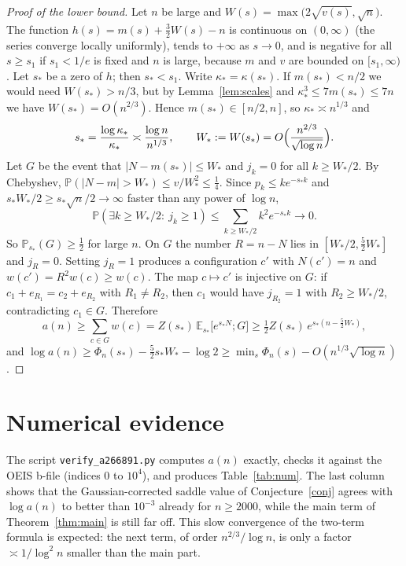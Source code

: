 \documentclass[11pt,a4paper]{article}
\theoremstyle{remark}
\begin{document}
\begin{proof}[Proof of the lower bound]
Let $n$ be large and $W(s)=\max\bigl(2\sqrt{v(s)},\sqrt n\bigr)$. The function $h(s)=m(s)+\frac32W(s)-n$ is continuous on $(0,\infty)$ (the series converge locally uniformly), tends to $+\infty$ as $s\to0$, and is negative for all $s\ge s_1$ if $s_1<1/e$ is fixed and $n$ is large, because $m$ and $v$ are bounded on $[s_1,\infty)$. Let $s_*$ be a zero of $h$; then $s_*<s_1$. Write $\kappa_*=\kappa(s_*)$. If $m(s_*)<n/2$ we would need $W(s_*)>n/3$, but by Lemma~\ref{lem:scales} and $\kappa_*^3\le7m(s_*)\le7n$ we have $W(s_*)=O(n^{2/3})$. Hence $m(s_*)\in[n/2,n]$, so $\kappa_*\asymp n^{1/3}$ and
\[
 s_*=\frac{\log\kappa_*}{\kappa_*}\asymp\frac{\log n}{n^{1/3}},\qquad W_*:=W(s_*)=O\Bigl(\frac{n^{2/3}}{\sqrt{\log n}}\Bigr).
\]
Let $G$ be the event that $|N-m(s_*)|\le W_*$ and $j_k=0$ for all $k\ge W_*/2$. By Chebyshev, $\mathbb P(|N-m|>W_*)\le v/W_*^2\le\frac14$. Since $p_k\le ke^{-s_*k}$ and $s_*W_*/2\ge s_*\sqrt n/2\to\infty$ faster than any power of $\log n$,
\[
 \mathbb P(\exists k\ge W_*/2:\ j_k\ge1)\le\sum_{k\ge W_*/2}k^2e^{-s_*k}\to0 .
\]
So $\mathbb P_{s_*}(G)\ge\frac12$ for large $n$. On $G$ the number $R=n-N$ lies in $[W_*/2,\frac52W_*]$ and $j_R=0$. Setting $j_R=1$ produces a configuration $c'$ with $N(c')=n$ and $w(c')=R^2w(c)\ge w(c)$. The map $c\mapsto c'$ is injective on $G$: if $c_1+e_{R_1}=c_2+e_{R_2}$ with $R_1\ne R_2$, then $c_1$ would have $j_{R_2}=1$ with $R_2\ge W_*/2$, contradicting $c_1\in G$. Therefore
\[
 a(n)\ge\sum_{c\in G}w(c)=Z(s_*)\,\mathbb E_{s_*}\bigl[e^{s_*N};G\bigr]\ge\tfrac12Z(s_*)\,e^{s_*(n-\frac52W_*)},
\]
and $\log a(n)\ge\Phi_n(s_*)-\frac52s_*W_*-\log2\ge\min_s\Phi_n(s)-O(n^{1/3}\sqrt{\log n})$.
\end{proof}

\section{Numerical evidence}\label{sec:num}

The script \texttt{verify\_a266891.py} computes $a(n)$ exactly, checks it against the OEIS b-file (indices $0$ to $10^4$), and produces Table~\ref{tab:num}. The last column shows that the Gaussian-corrected saddle value of Conjecture~\ref{conj} agrees with $\log a(n)$ to better than $10^{-3}$ already for $n\ge2000$, while the main term of Theorem~\ref{thm:main} is still far off. This slow convergence of the two-term formula is expected: the next term, of order $n^{2/3}/\log n$, is only a factor $\asymp1/\log^2n$ smaller than the main part.
\end{document}
